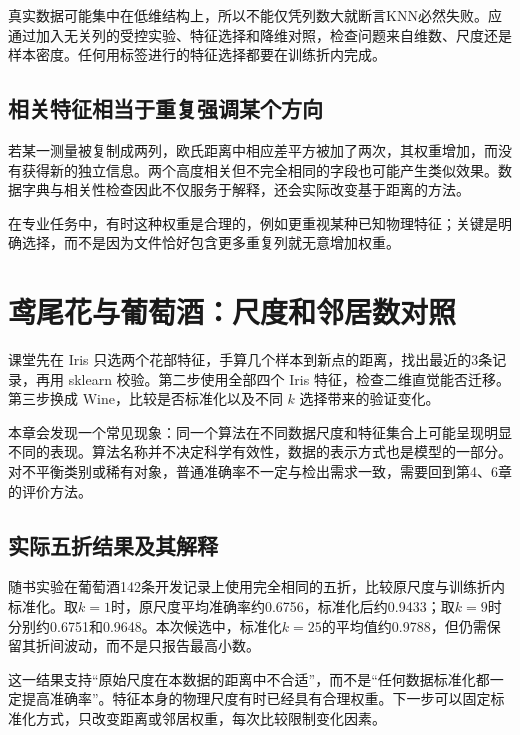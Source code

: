 真实数据可能集中在低维结构上，所以不能仅凭列数大就断言KNN必然失败。应通过加入无关列的受控实验、特征选择和降维对照，检查问题来自维数、尺度还是样本密度。任何用标签进行的特征选择都要在训练折内完成。

\subsection{相关特征相当于重复强调某个方向}
若某一测量被复制成两列，欧氏距离中相应差平方被加了两次，其权重增加，而没有获得新的独立信息。两个高度相关但不完全相同的字段也可能产生类似效果。数据字典与相关性检查因此不仅服务于解释，还会实际改变基于距离的方法。

在专业任务中，有时这种权重是合理的，例如更重视某种已知物理特征；关键是明确选择，而不是因为文件恰好包含更多重复列就无意增加权重。

\section{鸢尾花与葡萄酒：尺度和邻居数对照}
课堂先在 Iris 只选两个花部特征，手算几个样本到新点的距离，找出最近的3条记录，再用 sklearn 校验。第二步使用全部四个 Iris 特征，检查二维直觉能否迁移。第三步换成 Wine，比较是否标准化以及不同 $k$ 选择带来的验证变化。


本章会发现一个常见现象：同一个算法在不同数据尺度和特征集合上可能呈现明显不同的表现。算法名称并不决定科学有效性，数据的表示方式也是模型的一部分。对不平衡类别或稀有对象，普通准确率不一定与检出需求一致，需要回到第4、6章的评价方法。

\subsection{实际五折结果及其解释}
随书实验在葡萄酒142条开发记录上使用完全相同的五折，比较原尺度与训练折内标准化。取$k=1$时，原尺度平均准确率约0.6756，标准化后约0.9433；取$k=9$时分别约0.6751和0.9648。本次候选中，标准化$k=25$的平均值约0.9788，但仍需保留其折间波动，而不是只报告最高小数。


这一结果支持“原始尺度在本数据的距离中不合适”，而不是“任何数据标准化都一定提高准确率”。特征本身的物理尺度有时已经具有合理权重。下一步可以固定标准化方式，只改变距离或邻居权重，每次比较限制变化因素。

